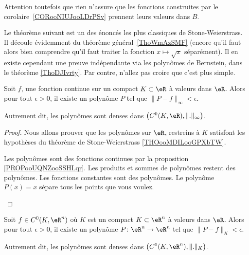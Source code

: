 Attention toutefois que rien n'assure que les fonctions construites par le corolaire~\ref{CORooNIUJooLDrPSv} prennent leurs valeurs dans \( B\).

Le théorème suivant est un des énoncés les plus classiques de Stone-Weierstrass. Il découle évidemment du théorème général~\ref{ThoWmAzSMF} (encore qu'il faut alors bien comprendre qu'il faut traiter la fonction \( x\mapsto \sqrt{x}\) séparément). Il en existe cependant une preuve indépendante via les polynômes de Bernstein, dans le théorème \ref{ThoDJIvrty}. Par contre, n'allez pas croire que c'est plus simple.

\begin{theorem}     \label{ThoGddfas}
	Soit \( f\), une fonction continue sur un compact \( K\subset \eR\) à valeurs dans \( \eR\). Alors pour tout \( \epsilon>0\), il existe un polynôme \( P\) tel que \( \| P-f \|_{\infty}<\epsilon\).

	Autrement dit, les polynômes sont denses dans \(\big(  C^0(K,\eR) ,\| . \|_{\infty}\big)\).
\end{theorem}

\begin{proof}
	Nous allons prouver que les polynômes sur \( \eR\), restreins à \( K\) satisfont les hypothèses du théorème de Stone-Weierstrass \ref{THOooMDILooGPXbTW}.
	\begin{subproof}
		\spitem[Partie de \(  C^0(K,\eR)\)]
		Les polynômes sont des fonctions continues par la proposition \ref{PROPooUQNZooSSHLqr}.
		Les produits et sommes de polynômes restent des polynômes.
		Les fonctions constantes sont des polynômes.
		Le polynôme \( P(x)=x\) sépare tous les points que vous voulez.
	\end{subproof}
\end{proof}


\begin{theorem}     \label{THOooJGAJooBcTtDH}
	Soit \( f\in C^0(K, \eR^n)\) où \( K\) est un compact \( K\subset \eR^n\) à valeurs dans \( \eR\). Alors pour tout \( \epsilon>0\), il existe un polynôme \(P \colon \eR^n\to \eR^n  \) tel que \( \| P-f \|_{K}<\epsilon\).

	Autrement dit, les polynômes sont denses dans \(\big(  C^0(K,\eR^n) ,\| . \|_{K}\big)\).
\end{theorem}

